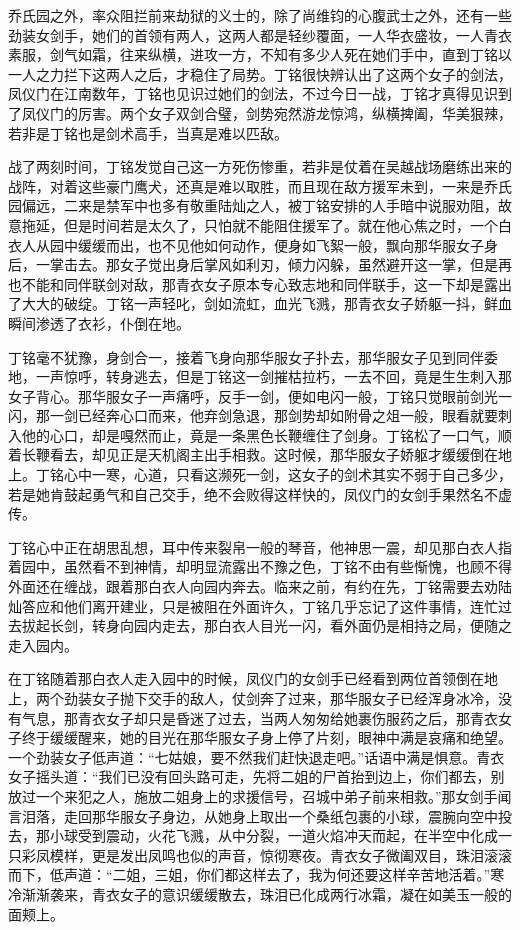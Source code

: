 乔氏园之外，率众阻拦前来劫狱的义士的，除了尚维钧的心腹武士之外，还有一些劲装女剑手，她们的首领有两人，这两人都是轻纱覆面，一人华衣盛妆，一人青衣素服，剑气如霜，往来纵横，进攻一方，不知有多少人死在她们手中，直到丁铭以一人之力拦下这两人之后，才稳住了局势。丁铭很快辨认出了这两个女子的剑法，凤仪门在江南数年，丁铭也见识过她们的剑法，不过今日一战，丁铭才真得见识到了凤仪门的厉害。两个女子双剑合璧，剑势宛然游龙惊鸿，纵横捭阖，华美狠辣，若非是丁铭也是剑术高手，当真是难以匹敌。

战了两刻时间，丁铭发觉自己这一方死伤惨重，若非是仗着在吴越战场磨练出来的战阵，对着这些豪门鹰犬，还真是难以取胜，而且现在敌方援军未到，一来是乔氏园偏远，二来是禁军中也多有敬重陆灿之人，被丁铭安排的人手暗中说服劝阻，故意拖延，但是时间若是太久了，只怕就不能阻住援军了。就在他心焦之时，一个白衣人从园中缓缓而出，也不见他如何动作，便身如飞絮一般，飘向那华服女子身后，一掌击去。那女子觉出身后掌风如利刃，倾力闪躲，虽然避开这一掌，但是再也不能和同伴联剑对敌，那青衣女子原本专心致志地和同伴联手，这一下却是露出了大大的破绽。丁铭一声轻叱，剑如流虹，血光飞溅，那青衣女子娇躯一抖，鲜血瞬间渗透了衣衫，仆倒在地。

丁铭毫不犹豫，身剑合一，接着飞身向那华服女子扑去，那华服女子见到同伴委地，一声惊呼，转身逃去，但是丁铭这一剑摧枯拉朽，一去不回，竟是生生刺入那女子背心。那华服女子一声痛呼，反手一剑，便如电闪一般，丁铭只觉眼前剑光一闪，那一剑已经奔心口而来，他弃剑急退，那剑势却如附骨之俎一般，眼看就要刺入他的心口，却是嘎然而止，竟是一条黑色长鞭缠住了剑身。丁铭松了一口气，顺着长鞭看去，却见正是天机阁主出手相救。这时候，那华服女子娇躯才缓缓倒在地上。丁铭心中一寒，心道，只看这濒死一剑，这女子的剑术其实不弱于自己多少，若是她肯鼓起勇气和自己交手，绝不会败得这样快的，凤仪门的女剑手果然名不虚传。

丁铭心中正在胡思乱想，耳中传来裂帛一般的琴音，他神思一震，却见那白衣人指着园中，虽然看不到神情，却明显流露出不豫之色，丁铭不由有些惭愧，也顾不得外面还在缠战，跟着那白衣人向园内奔去。临来之前，有约在先，丁铭需要去劝陆灿答应和他们离开建业，只是被阻在外面许久，丁铭几乎忘记了这件事情，连忙过去拔起长剑，转身向园内走去，那白衣人目光一闪，看外面仍是相持之局，便随之走入园内。

在丁铭随着那白衣人走入园中的时候，凤仪门的女剑手已经看到两位首领倒在地上，两个劲装女子抛下交手的敌人，仗剑奔了过来，那华服女子已经浑身冰冷，没有气息，那青衣女子却只是昏迷了过去，当两人匆匆给她裹伤服药之后，那青衣女子终于缓缓醒来，她的目光在那华服女子身上停了片刻，眼神中满是哀痛和绝望。一个劲装女子低声道：“七姑娘，要不然我们赶快退走吧。”话语中满是惧意。青衣女子摇头道：“我们已没有回头路可走，先将二姐的尸首抬到边上，你们都去，别放过一个来犯之人，施放二姐身上的求援信号，召城中弟子前来相救。”那女剑手闻言泪落，走回那华服女子身边，从她身上取出一个桑纸包裹的小球，震腕向空中投去，那小球受到震动，火花飞溅，从中分裂，一道火焰冲天而起，在半空中化成一只彩凤模样，更是发出凤鸣也似的声音，惊彻寒夜。青衣女子微阖双目，珠泪滚滚而下，低声道：“二姐，三姐，你们都这样去了，我为何还要这样辛苦地活着。”寒冷渐渐袭来，青衣女子的意识缓缓散去，珠泪已化成两行冰霜，凝在如美玉一般的面颊上。

